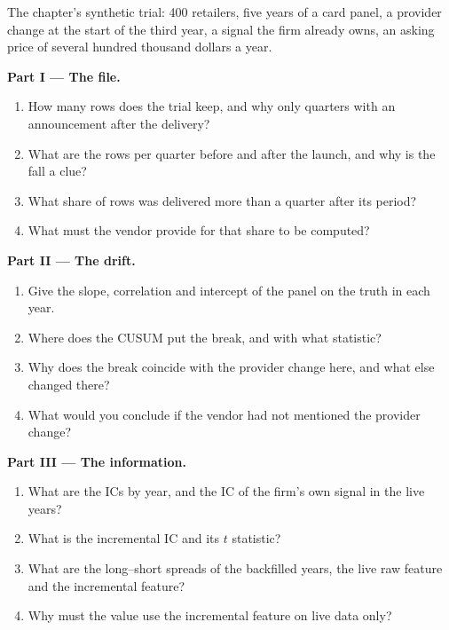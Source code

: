 \begin{problem}\label{pb:rs:alternative-and-text-data:1}
The chapter's synthetic trial: 400 retailers, five years of a card panel, a provider change at the start of the third year, a signal the firm
already owns, an asking price of several hundred thousand dollars a year.

\medskip\noindent\textbf{Part I --- The file.}
\begin{enumerate}
\item How many rows does the trial keep, and why only quarters with an announcement after the delivery?
\item What are the rows per quarter before and after the launch, and why is the fall a clue?
\item What share of rows was delivered more than a quarter after its period?
\item What must the vendor provide for that share to be computed?
\end{enumerate}

\medskip\noindent\textbf{Part II --- The drift.}
\begin{enumerate}[resume]
\item Give the slope, correlation and intercept of the panel on the truth in each year.
\item Where does the CUSUM put the break, and with what statistic?
\item Why does the break coincide with the provider change here, and what else changed there?
\item What would you conclude if the vendor had not mentioned the provider change?
\end{enumerate}

\medskip\noindent\textbf{Part III --- The information.}
\begin{enumerate}[resume]
\item What are the ICs by year, and the IC of the firm's own signal in the live years?
\item What is the incremental IC and its $t$ statistic?
\item What are the long--short spreads of the backfilled years, the live raw feature and the incremental feature?
\item Why must the value use the incremental feature on live data only?
\end{enumerate}


\end{problem}
